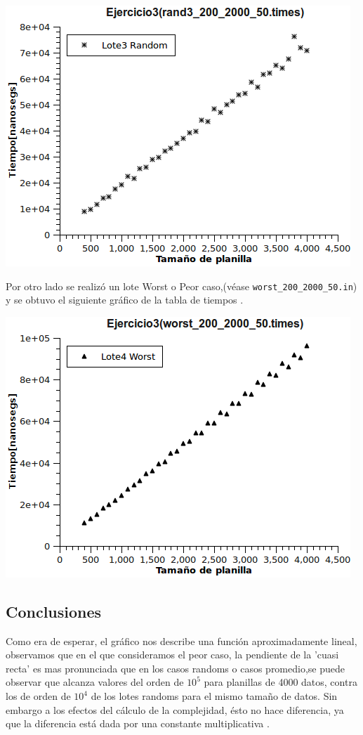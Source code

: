 \includegraphics[scale=0.8]{Graph3.png}
\newline


Por otro lado se realizó un lote Worst o Peor caso,(véase \texttt{worst\_200\_2000\_50.in}) y se obtuvo el siguiente gráfico de la tabla de tiempos .

\includegraphics[scale=0.8]{Graph4.png}





\subsection{Conclusiones}

Como era de esperar, el gráfico nos describe una función aproximadamente lineal, observamos que en el que consideramos el peor caso, la pendiente de la 'cuasi recta' es mas pronunciada que en los casos randoms o casos promedio,se puede observar que alcanza valores del orden de $10^{5}$ para planillas de 4000 datos, contra los de orden de $10^{4}$ de los lotes randoms para el mismo tamaño de datos. 
\newline
Sin embargo a los efectos del cálculo de la complejidad, ésto no hace diferencia, ya que la diferencia está dada por una constante multiplicativa .



